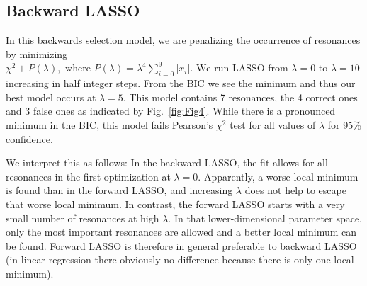 \documentclass[aps, prd, twocolumn, showpacs, superscriptaddress,
preprintnumbers, nofootinbib]{revtex4-1}
\begin{document}
\subsection{Backward LASSO}

In this backwards selection model, we are penalizing the occurrence of resonances by minimizing  $\chi^2+P(\lambda), \text{ where } P(\lambda) =   \lambda^4 \sum_{i=0}^{9}  |x_i|   \text{. We run LASSO from } \lambda = 0 \text{ to } \lambda = 10$ increasing in half integer steps. From the BIC we see the minimum and thus our best model occurs at $\lambda=5$. This model contains 7 resonances, the 4 correct ones and 3 false ones as indicated by Fig.~\ref{fig:Fig4}. While there is a pronounced minimum in the BIC, this model fails Pearson's $\chi^2$ test for all values of $\lambda$ for 95\% confidence.

We interpret this as follows: In the backward LASSO, the fit allows for all resonances in the first optimization at $\lambda=0$. Apparently, a worse local minimum is found than in the forward LASSO, and increasing $\lambda$ does not help to escape that worse local minimum. In contrast, the forward LASSO starts with a very small number of resonances at high $\lambda$. In that lower-dimensional parameter space, only the most important resonances are allowed and a better local minimum can be found. Forward LASSO is therefore in general preferable to backward LASSO (in linear regression there obviously no difference because there is only one local minimum).
\end{document}
